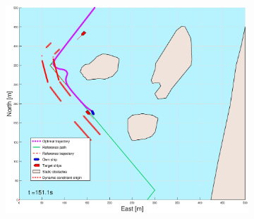 \begin{figure}[!ht]
\begin{subfigure}[b]{0.49\textwidth}
    \end{subfigure}
    \hfill
    \begin{subfigure}[b]{0.499\textwidth}
        \centering
        \includegraphics[width=\textwidth]{Images/Figures/Helloya/_Simple_0fig999_time=151}
    \end{subfigure}
    \hfill
\end{figure}%
